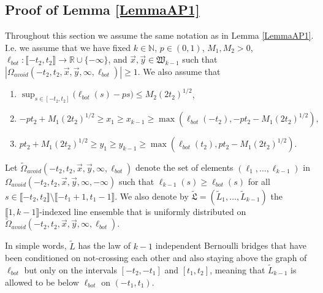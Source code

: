 	
	
\subsection{Proof of Lemma \ref{LemmaAP1}} Throughout this section we assume the same notation as in Lemma \ref{LemmaAP1}. I.e. we assume that we have fixed $k \in \mathbb{N}$, $p \in (0,1)$, $M_1, M_2 > 0$, $\ell_{bot}: \llbracket -t_2, t_2 \rrbracket \rightarrow \mathbb{R} \cup \{ - \infty \}$, and $\vec{x}, \vec{y} \in \mathfrak{W}_{k-1}$ such that $|\Omega_{avoid}(-t_2, t_2, \vec{x}, \vec{y}, \infty, \ell_{bot})| \geq 1$. We also assume that
\begin{enumerate}
	\item $\sup_{s \in [- t_2,t_2]}\big(\ell_{bot}(s)  - ps \big)  \leq M_2 (2t_2)^{1/2}$,
	\item  $-pt_2 + M_1 (2t_2)^{1/2} \geq  x_1 \geq  x_{k-1} \geq \max\left(\ell_{bot}(-t_2), -pt_2- M_1 (2t_2)^{1/2}\right),$
	\item $pt_2 + M_1 (2t_2)^{1/2} \geq y_1 \geq y_{k-1} \geq  \max \left( \ell_{bot}(t_2),  p t_2- M_1(2t_2)^{1/2} \right).$
\end{enumerate}

\begin{definition}
	Let $\tilde{\Omega}_{avoid}(-t_2, t_2, \vec{x}, \vec{y}, \infty, \ell_{bot})$ denote the set of elements $(\ell_1, \dots, \ell_{k-1})$ in \\${\Omega}_{avoid}(-t_2, t_2, \vec{x}, \vec{y}, \infty, -\infty)$ such that $\ell_{k-1}(s) \geq \ell_{bot}(s)$ for all $s \in \llbracket -t_2, t_2 \rrbracket \setminus \llbracket -t_1 + 1, t_1 - 1 \rrbracket$. We also denote by $\tilde{\mathfrak{L}} = (\tilde{L}_1, \dots, \tilde{L}_{k-1})$ the $\llbracket 1, k-1 \rrbracket$-indexed line ensemble that is uniformly distributed on $\tilde{\Omega}_{avoid}(-t_2, t_2, \vec{x}, \vec{y}, \infty, \ell_{bot})$.
\end{definition}
In simple words, $\tilde{L}$ has the law of $k-1$ independent Bernoulli bridges that have been conditioned on not-crossing each other and also staying above the graph of $\ell_{bot}$ but only on the intervals $[-t_2, -t_1]$ and $[t_1, t_2]$, meaning that $\tilde{L}_{k-1}$ is allowed to be below $\ell_{bot}$ on $(-t_1, t_1).$ 

